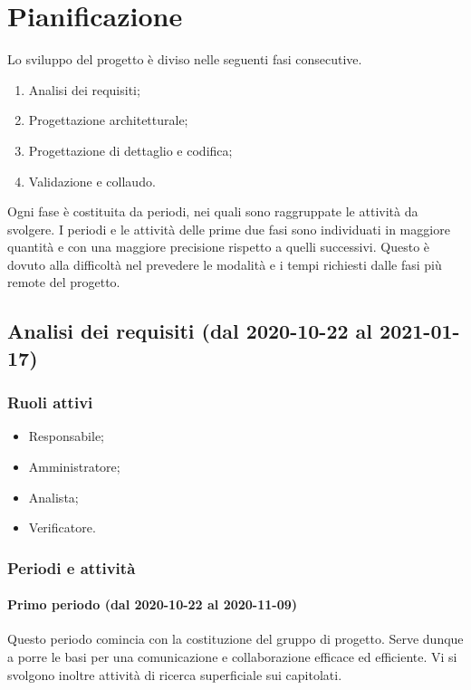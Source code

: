 \section{Pianificazione}
Lo sviluppo del progetto è diviso nelle seguenti fasi consecutive.
\begin{enumerate}
	\item Analisi dei requisiti;
	\item Progettazione architetturale;
	\item Progettazione di dettaglio e codifica;
	\item Validazione e collaudo.
\end{enumerate}
Ogni fase è costituita da periodi, nei quali sono raggruppate le attività da svolgere.
I periodi e le attività delle prime due fasi sono individuati in maggiore quantità e con una maggiore precisione rispetto a quelli successivi. Questo è dovuto alla difficoltà nel prevedere le modalità e i tempi richiesti dalle fasi più remote del progetto.

\subsection{Analisi dei requisiti (dal 2020-10-22 al 2021-01-17)}

\subsubsection{Ruoli attivi}
\begin{itemize}
	\item Responsabile;
	\item Amministratore;
	\item Analista;
	\item Verificatore.
\end{itemize}

\subsubsection{Periodi e attività}

\paragraph{Primo periodo (dal 2020-10-22 al 2020-11-09)}
Questo periodo comincia con la costituzione del gruppo di progetto. Serve dunque a porre le basi per una comunicazione e collaborazione efficace ed efficiente. Vi si svolgono inoltre attività di ricerca superficiale sui capitolati.

